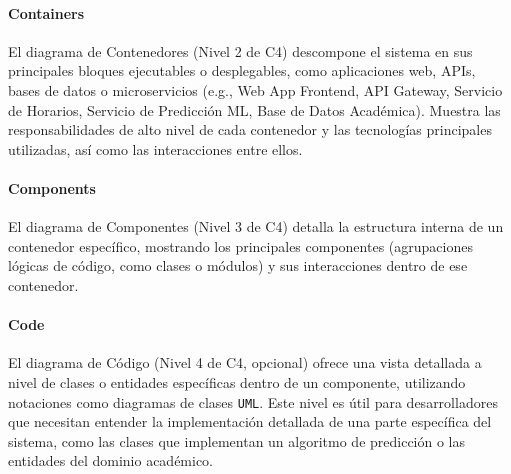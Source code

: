\paragraph{Containers}
El diagrama de Contenedores (Nivel 2 de C4) descompone el sistema en sus principales bloques ejecutables o desplegables, como aplicaciones web, APIs, bases de datos o microservicios (e.g., Web App Frontend, API Gateway, Servicio de Horarios, Servicio de Predicción ML, Base de Datos Académica).
Muestra las responsabilidades de alto nivel de cada contenedor y las tecnologías principales utilizadas, así como las interacciones entre ellos.

\paragraph{Components}
El diagrama de Componentes (Nivel 3 de C4) detalla la estructura interna de un contenedor específico, mostrando los principales componentes (agrupaciones lógicas de código, como clases o módulos) y sus interacciones dentro de ese contenedor.

\paragraph{Code}
El diagrama de Código (Nivel 4 de C4, opcional) ofrece una vista detallada a nivel de clases o entidades específicas dentro de un componente, utilizando notaciones como diagramas de clases \texttt{UML}.
Este nivel es útil para desarrolladores que necesitan entender la implementación detallada de una parte específica del sistema, como las clases que implementan un algoritmo de predicción o las entidades del dominio académico.
